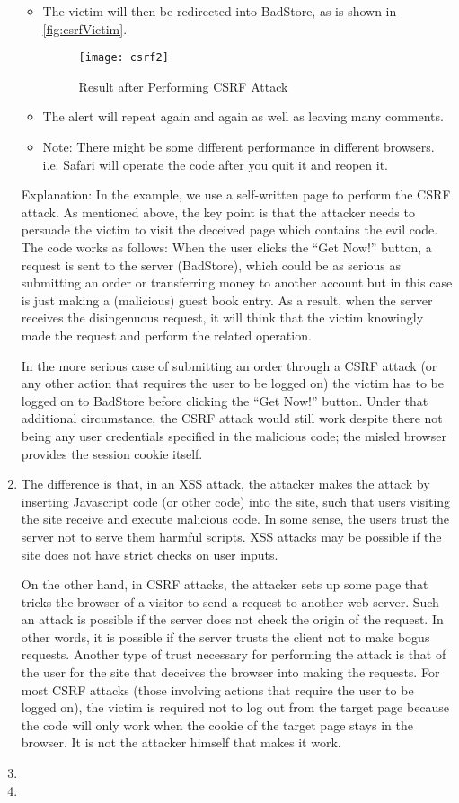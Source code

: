 \begin{enumerate}
\begin{itemize}
  \item The victim will then be redirected into BadStore, as is shown in \autoref{fig:csrfVictim}.
    \begin{figure}[h!]
      \caption{Result after Performing CSRF Attack}
      \label{fig:csrfVictim}
      \begin{center}\texttt{[image: csrf2]}
      \end{center}
    \end{figure}
  \item The alert will repeat again and again as well as leaving many comments.
  \item Note: There might be some different performance in different browsers. i.e. Safari will operate the code after you quit it and reopen it.
  \end{itemize}
  \indent Explanation: In the example, we use a self-written page to perform the CSRF attack. As mentioned above, the key point is that the attacker needs to persuade the victim to visit the deceived page which contains the evil code. The code works as follows: When the user clicks the ``Get Now!'' button, a request is sent to the server (BadStore), which could be as serious as submitting an order or transferring money to another account but in this case is just making a (malicious) guest book entry. As a result, when the server receives the disingenuous request, it will think that the victim knowingly made the request and perform the related operation.

In the more serious case of submitting an order through a CSRF attack (or any other action that requires the user to be logged on) the victim has to be logged on to BadStore before clicking the ``Get Now!'' button. Under that additional circumstance, the CSRF attack would still work despite there not being any user credentials specified in the malicious code; the misled browser provides the session cookie itself.
\item The difference is that, in an XSS attack, the attacker makes the attack by inserting Javascript code (or other code) into the site, such that users visiting the site receive and execute malicious code. In some sense, the users trust the server not to serve them harmful scripts. XSS attacks may be possible if the site does not have strict checks on user inputs.

On the other hand, in CSRF attacks, the attacker sets up some page that tricks the browser of a visitor to send a request to another web server. Such an attack is possible if the server does not check the origin of the request. In other words, it is possible if the server trusts the client not to make bogus requests. Another type of trust necessary for performing the attack is that of the user for the site that deceives the browser into making the requests. For most CSRF attacks (those involving actions that require the user to be logged on), the victim is required not to log out from the target page because the code will only work when the cookie of the target page stays in the browser. It is not the attacker himself that makes it work.
\item \highergradesonly
\item \highergradesonly
\end{enumerate}
